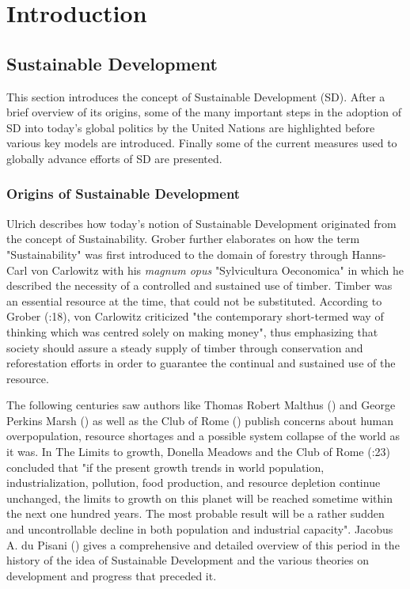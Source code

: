 	
	\section{Introduction}
		
		\subsection{Sustainable Development}
    		This section introduces the concept of Sustainable Development (SD). After a brief overview of its origins, some of the many important steps in the adoption of SD into today's global politics by the United Nations are highlighted before various key models are introduced. Finally some of the current measures used to globally advance efforts of SD are presented.
		
		    \subsubsection{Origins of Sustainable Development}
		        Ulrich \citet{grober2007} describes how today's notion of Sustainable Development originated from the concept of Sustainability. Grober further elaborates on how the term "Sustainability" was first introduced to the domain of forestry through Hanns-Carl von Carlowitz \citet{voncarlowitz1732} with his \textit{magnum opus} "Sylvicultura Oeconomica" in which he described the necessity of a controlled and sustained use of timber. Timber was an essential resource at the time, that could not be substituted. According to Grober (\citeyear{grober2007}:18), von Carlowitz criticized "the contemporary short-termed way of thinking which was centred solely on making money", thus emphasizing that society should assure a steady supply of timber through conservation and reforestation efforts in order to guarantee the continual and sustained use of the resource.
		        \medskip
		        
		        The following centuries saw authors like Thomas Robert Malthus (\citeyear{malthus1926}) and George Perkins Marsh (\citeyear{marsh1965}) as well as the Club of Rome (\citeyear{meadows1972a}) publish concerns about human overpopulation, resource shortages and a possible system collapse of the world as it was. In The Limits to growth, Donella Meadows and the Club of Rome (\citeyear{meadows1972a}:23) concluded that "if the present growth trends in world population, industrialization, pollution, food production, and resource depletion continue unchanged, the limits to growth on this planet will be reached sometime within the next one hundred years. The most probable result will be a rather sudden and uncontrollable decline in both population and industrial capacity". Jacobus A. du Pisani (\citeyear{dupisani2006}) gives a comprehensive and detailed overview of this period in the history of the idea of Sustainable Development and the various theories on development and progress that preceded it.
		        \medskip
		        
